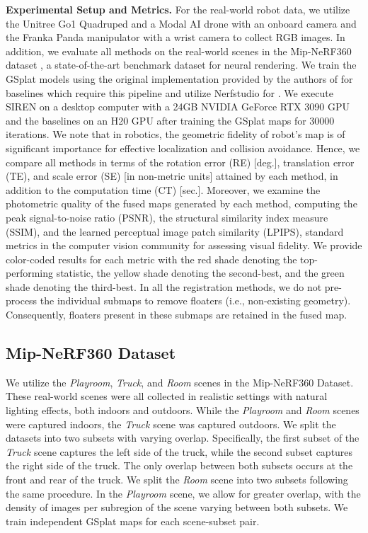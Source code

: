 \label{ssec:experiment_metrics}
\smallskip
\noindent\textbf{Experimental Setup and Metrics.}
For the real-world robot data, we utilize the Unitree Go1 Quadruped and a Modal AI drone with an onboard camera and the Franka Panda manipulator with a wrist camera to collect RGB images. In addition, we evaluate all methods on the real-world scenes in the Mip-NeRF360 dataset \cite{barron2022mip}, a state-of-the-art benchmark dataset for neural rendering. We train the GSplat models using the original implementation provided by the authors of \cite{kerbl20233d} for baselines which require this pipeline and utilize Nerfstudio \cite{tancik2023nerfstudio} for \algname. We execute SIREN on a desktop computer with a 24GB NVIDIA GeForce RTX 3090 GPU and the baselines on an H20 GPU after training the GSplat maps for $30000$ iterations.
We note that in robotics, the geometric fidelity of robot's map is of significant importance for effective localization and collision avoidance. Hence, we compare all methods in terms of the rotation error (RE) [deg.], translation error (TE), and scale error (SE) [in non-metric units] attained by each method, in addition to the computation time (CT) [sec.]. Moreover, we examine the photometric quality of the fused maps generated by each method, computing the peak signal-to-noise ratio (PSNR), the structural similarity index measure (SSIM), and the learned perceptual image patch similarity (LPIPS), standard metrics in the computer vision community for assessing visual fidelity. 
We provide color-coded results for each metric with the red shade denoting the top-performing statistic, the yellow shade denoting the second-best, and the green shade denoting the third-best. In all the registration methods, we do not pre-process the individual submaps to remove floaters (i.e., non-existing geometry). Consequently, floaters present in these submaps are retained in the fused map.

\subsection{Mip-NeRF360 Dataset}
We utilize the \emph{Playroom}, \emph{Truck}, and \emph{Room} scenes in the Mip-NeRF360 Dataset. These real-world scenes were all collected in realistic settings with natural lighting effects, both indoors and outdoors. While the \emph{Playroom} and \emph{Room} scenes were captured indoors, the \emph{Truck} scene was captured outdoors. We split the datasets into two subsets with varying overlap. Specifically, the first subset of the \emph{Truck} scene captures the left side of the truck, while the second subset captures the right side of the truck. The only overlap between both subsets occurs at the front and rear of the truck. We split the \emph{Room} scene into two subsets following the same procedure. In the \emph{Playroom} scene, we allow for greater overlap, with the density of images per subregion of the scene varying between both subsets. We train independent GSplat maps for each scene-subset pair.  

